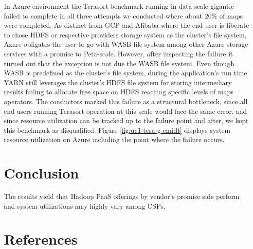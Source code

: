 \documentclass[review]{elsarticle}
\begin{document}
In Azure environment the Terasort benchmark running in data scale gigantic failed to complete in all three attempts we conducted where about 20\% of maps were completed. As distinct from GCP and Alibaba where the end user is liberate to chose HDFS or respective providers storage system as the cluster's file system, Azure obligates the user to go with WASB file system among other Azure storage services with a promise to Peta-scale. However, after inspecting the failure it turned out that the exception is not due the WASB file system. Even though WASB is predefined as the cluster's file system, during the application's run time YARN still leverages the cluster's HDFS file system for storing intermediary results failing to allocate free space on HDFS reaching specific levels of maps operators. The conductors marked this failure as a structural bottleneck, since all end users running Terasort operation at this scale would face the same error, and since resource utilization can be tracked up to the failure point and after, we kept this benchmark as disqualified. Figure \ref{fig:uc1-tera-g-cmidt} displays system resource utilization on Azure including the point where the failure occurs.




\section{Conclusion}
The results yield that Hadoop PaaS offerings by vendor's promise side perform and system utilizations may highly vary among CSPs.

\section*{References}

\end{document}
